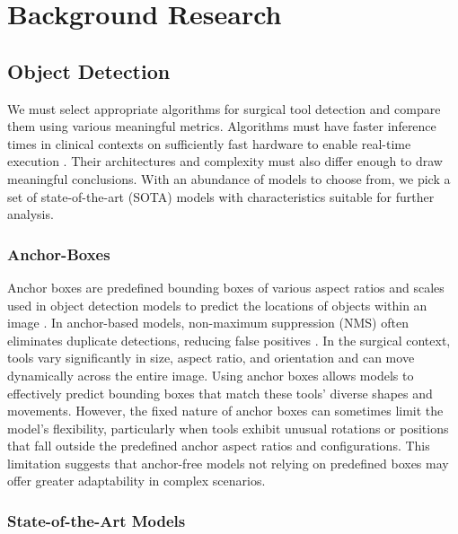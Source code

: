 \section{Background Research}

\subsection{Object Detection}

We must select appropriate algorithms for surgical tool detection and compare them using various meaningful metrics. Algorithms must have faster inference times in clinical contexts on sufficiently fast hardware to enable real-time execution \cite{ali2023comprehensivesurveyrecentdeep}. Their architectures and complexity must also differ enough to draw meaningful conclusions. With an abundance of models to choose from, we pick a set of state-of-the-art (SOTA) models with characteristics suitable for further analysis.

\subsubsection{Anchor-Boxes}

Anchor boxes are predefined bounding boxes of various aspect ratios and scales used in object detection models to predict the locations of objects within an image \cite{Zhong_2020_WACV, wang_region_2019}. In anchor-based models, non-maximum suppression (NMS) often eliminates duplicate detections, reducing false positives \cite{redmon_you_2016}. In the surgical context, tools vary significantly in size, aspect ratio, and orientation and can move dynamically across the entire image. Using anchor boxes allows models to effectively predict bounding boxes that match these tools' diverse shapes and movements. However, the fixed nature of anchor boxes can sometimes limit the model's flexibility, particularly when tools exhibit unusual rotations or positions that fall outside the predefined anchor aspect ratios and configurations. This limitation suggests that anchor-free models not relying on predefined boxes may offer greater adaptability in complex scenarios. 

\subsubsection{State-of-the-Art Models}

